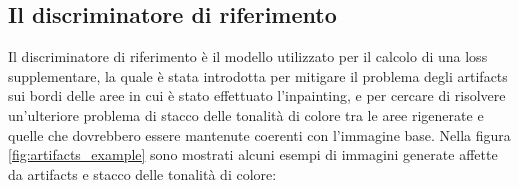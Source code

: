 \subsection{Il discriminatore di riferimento}
Il discriminatore di riferimento è il modello utilizzato per il calcolo di una loss supplementare, la quale è stata introdotta per mitigare
il problema degli artifacts sui bordi delle aree in cui è stato effettuato l'inpainting, e per cercare di risolvere un'ulteriore problema
di stacco delle tonalità di colore tra le aree rigenerate e quelle che dovrebbero essere mantenute coerenti con l'immagine base.
Nella figura \ref{fig:artifacts_example} sono mostrati alcuni esempi di immagini generate affette da artifacts e stacco delle tonalità di colore:
\begin{figure}[htbp]
    \centering
    \begin{subfigure}[b]{0.3\textwidth}

\end{subfigure}
\end{figure}
